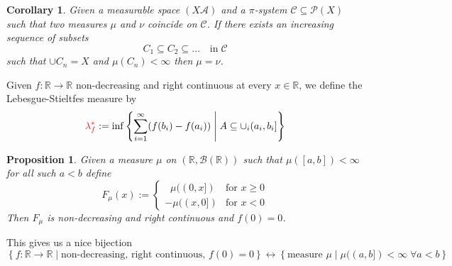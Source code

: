 \documentclass[11pt]{article}
\newcommand{\defeq}{:=}
\newcommand{\relmiddle}[1]{\mathrel{}\middle#1\mathrel{}}
\newcommand{\rmv}{\relmiddle|}
\newcommand{\R}{\mathbb{R}}
\newenvironment{defin}
	{\begin{mdframed}[backgroundcolor=white, roundcorner=5pt, linewidth=1pt]}
	{\end{mdframed}}
\newcommand{\mdf}[1]{{\color{red} #1}}
\newtheorem{prop}[theorem]{Proposition}
\newtheorem{cor}[theorem]{Corollary}
\begin{document}
\begin{cor}
	Given a measurable space $(X\mathcal{A})$ and a $\pi$-system $\mathcal{C}\subseteq\mathcal{P}(X)$ such that two measures $\mu$ and $\nu$ coincide on $\mathcal{C}$.
	If there exists an increasing sequence of subsets
	\[
		C_1 \subseteq C_2 \subseteq \dots \quad \text{in}\; \mathcal{C}
	\]
	such that $\cup C_n=X$ and $\mu(C_n)<\infty$ then $\mu= \nu$.
\end{cor}
\begin{defin}
	Given $f:\R\to\R$ non-decreasing and right continuous at every $x\in\R$, we define the \mdf{Lebesgue-Stieltfes measure} by
	\[
		\mdf{\lambda_f^\ast}\defeq\inf\left\{\sum_{i=1}^\infty (f(b_i) - f(a_i)) \rmv A \subseteq \cup_i (a_i, b_i] \right\}
	\]
	
\end{defin}
\begin{prop}
Given a measure $\mu$ on $(\R, \mathcal{B}(\R))$ such that $\mu([a, b])< \infty$ for all such $a<b$ define
\[
	F_\mu (x)\defeq
	\begin{cases}
		\;\;\mu((0, x]) & \text{for } x\geq 0 \\
		-\mu((x, 0]) & \text{for } x< 0
	\end{cases}
\]
Then $F_\mu$ is non-decreasing and right continuous and $f(0)=0$.
\end{prop}
This gives us a nice bijection
\[
	\left\{f: \R \to \R \rmv \text{non-decreasing, right continuous, }f(0)=0\right\}\leftrightarrow\left\{\text{measure }\mu \rmv \mu((a,b])<\infty\; \forall a< b\right\}
\]
\end{document}
